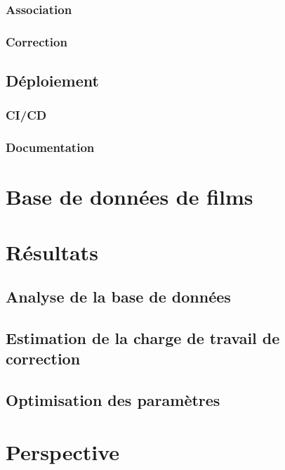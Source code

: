		
		\subsection{Association}
		\subsection{Correction}
		
	\section{Déploiement}
		\subsection{CI/CD}
		\subsection{Documentation}

		
\chapter{Base de données de films}


\chapter{Résultats}

	\section{Analyse de la base de données}
	
	\section{Estimation de la charge de travail de correction}
	
	\section{Optimisation des paramètres}
	
	
\chapter{Perspective}